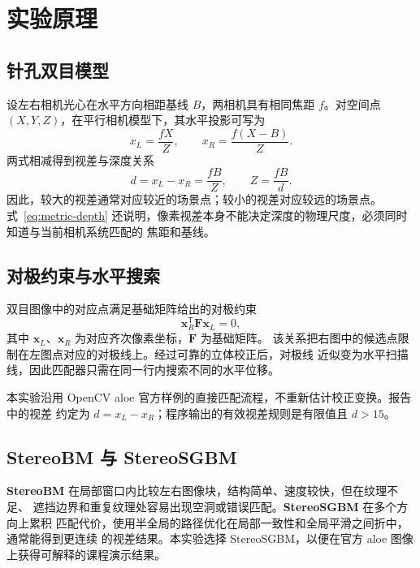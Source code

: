 \section{实验原理}

\subsection{针孔双目模型}

设左右相机光心在水平方向相距基线 $B$，两相机具有相同焦距 $f$。对空间点
$(X,Y,Z)$，在平行相机模型下，其水平投影可写为
\begin{equation}
  x_L=\frac{fX}{Z},\qquad
  x_R=\frac{f(X-B)}{Z}.
\end{equation}
两式相减得到视差与深度关系
\begin{equation}
  d=x_L-x_R=\frac{fB}{Z},\qquad
  Z=\frac{fB}{d}.
  \label{eq:metric-depth}
\end{equation}
因此，较大的视差通常对应较近的场景点；较小的视差对应较远的场景点。式~\eqref{eq:metric-depth}
还说明，像素视差本身不能决定深度的物理尺度，必须同时知道与当前相机系统匹配的
焦距和基线。

\subsection{对极约束与水平搜索}

双目图像中的对应点满足基础矩阵给出的对极约束
\begin{equation}
  \mathbf{x}_R^{\mathsf{T}}\mathbf{F}\mathbf{x}_L=0,
\end{equation}
其中 $\mathbf{x}_L$、$\mathbf{x}_R$ 为对应齐次像素坐标，$\mathbf{F}$ 为基础矩阵。
该关系把右图中的候选点限制在左图点对应的对极线上。经过可靠的立体校正后，对极线
近似变为水平扫描线，因此匹配器只需在同一行内搜索不同的水平位移。

本实验沿用 OpenCV aloe 官方样例的直接匹配流程，不重新估计校正变换。报告中的视差
约定为 $d=x_L-x_R$；程序输出的有效视差规则是有限值且 $d>15$。

\subsection{StereoBM 与 StereoSGBM}

\textbf{StereoBM} 在局部窗口内比较左右图像块，结构简单、速度较快，但在纹理不足、
遮挡边界和重复纹理处容易出现空洞或错误匹配。\textbf{StereoSGBM} 在多个方向上累积
匹配代价，使用半全局的路径优化在局部一致性和全局平滑之间折中，通常能得到更连续
的视差结果。本实验选择 StereoSGBM，以便在官方 aloe 图像上获得可解释的课程演示结果。

